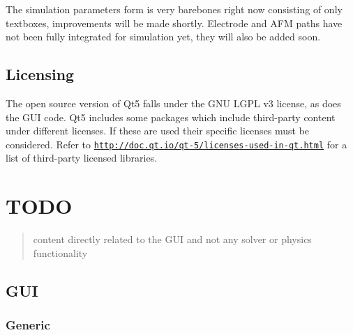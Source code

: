 The simulation parameters form is very barebones right now consisting of only textboxes, improvements will be made shortly. Electrode and A\+FM paths have not been fully integrated for simulation yet, they will also be added soon.

\subsection*{Licensing}

The open source version of Qt5 falls under the G\+NU L\+G\+PL v3 license, as does the G\+UI code. Qt5 includes some packages which include third-\/party content under different licenses. If these are used their specific licenses must be considered. Refer to \href{http://doc.qt.io/qt-5/licenses-used-in-qt.html}{\tt http\+://doc.\+qt.\+io/qt-\/5/licenses-\/used-\/in-\/qt.\+html} for a list of third-\/party licensed libraries.

\section*{T\+O\+DO}

\begin{quote}
content directly related to the G\+UI and not any solver or physics functionality \end{quote}
\subsection*{G\+UI}

\subsubsection*{Generic}


